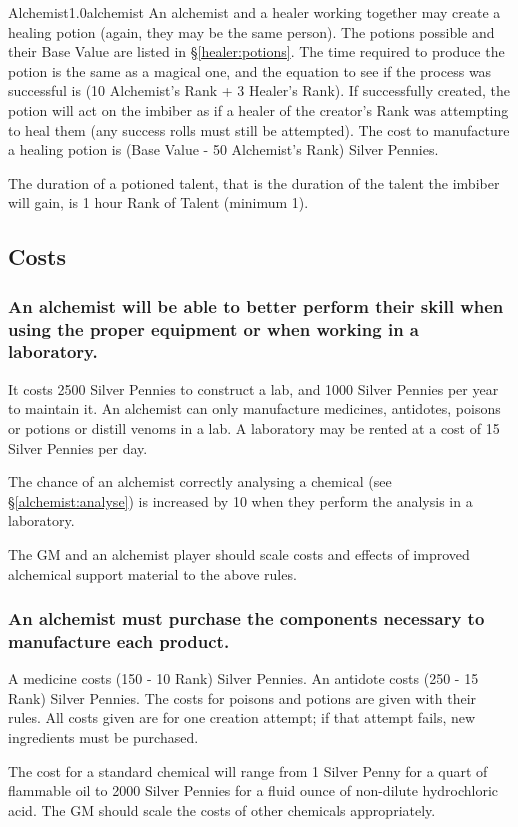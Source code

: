 \begin{skill}{Alchemist}{1.0}{alchemist}
An alchemist and a healer working together may create a healing potion
(again, they may be the same person).  The potions possible and their
Base Value are listed in \S\ref{healer:potions}.  The time required to
produce the potion is the same as a magical one, and the equation to
see if the process was successful is (10 \x Alchemist's Rank + 3 \x
Healer's Rank). If successfully created, the potion will act on the
imbiber as if a healer of the creator's Rank was attempting to heal
them (any success rolls must still be attempted).  The cost to
manufacture a healing potion is (Base Value - 50 \x Alchemist's Rank)
Silver Pennies.

The duration of a potioned talent, that is the duration of the talent
the imbiber will gain, is 1 hour \x Rank of Talent (minimum 1).

\subsection{Costs}

\subsubsection{An alchemist will be able to better perform their skill
when using the proper equipment or when working in a laboratory.}
\label{alchemist:lab}

It costs 2500 Silver Pennies to construct a lab, and 1000 Silver
Pennies per year to maintain it.  An alchemist can only manufacture
medicines, antidotes, poisons or potions or distill venoms in a lab.
A laboratory may be rented at a cost of 15 Silver Pennies per day.

The chance of an alchemist correctly analysing a chemical (see
\S\ref{alchemist:analyse}) is increased by 10 when they perform the
analysis in a laboratory.

The GM and an alchemist player should scale costs and effects of
improved alchemical support material to the above rules.

\subsubsection{An alchemist must purchase the components necessary to
manufacture each product.}

A medicine costs (150 - 10 \x Rank) Silver Pennies.  An antidote costs
(250 - 15 \x Rank) Silver Pennies.  The costs for poisons and potions
are given with their rules.  All costs given are for one creation
attempt; if that attempt fails, new ingredients must be purchased.

The cost for a standard chemical will range from 1 Silver Penny for a
quart of flammable oil to 2000 Silver Pennies for a fluid ounce of
non-dilute hydrochloric acid.  The GM should scale the costs of other
chemicals appropriately.

\end{skill}
